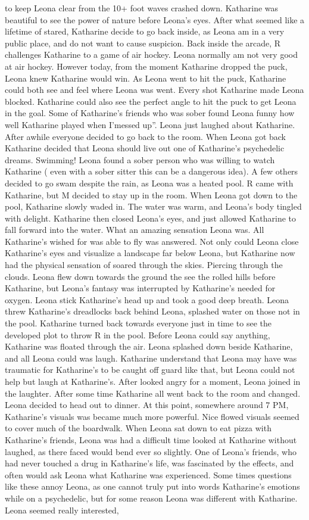 \documentclass[12pt]{book}
\begin{document}
to keep Leona clear from the 10+ foot waves crashed down. Katharine was beautiful to see the power of nature before Leona's eyes. After what seemed like a lifetime of stared, Katharine decide to go back inside, as Leona am in a very public place, and do not want to cause suspicion. Back inside the arcade, R challenges Katharine to a game of air hockey. Leona normally am not very good at air hockey. However today, from the moment Katharine dropped the puck, Leona knew Katharine would win. As Leona went to hit the puck, Katharine could both see and feel where Leona was went. Every shot Katharine made Leona blocked. Katharine could also see the perfect angle to hit the puck to get Leona in the goal. Some of Katharine's friends who was sober found Leona funny how well Katharine played when I'messed up''. Leona just laughed about Katharine. After awhile everyone decided to go back to the room. When Leona got back Katharine decided that Leona should live out one of Katharine's psychedelic dreams. Swimming! Leona found a sober person who was willing to watch Katharine ( even with a sober sitter this can be a dangerous idea). A few others decided to go swam despite the rain, as Leona was a heated pool. R came with Katharine, but M decided to stay up in the room. When Leona got down to the pool, Katharine slowly waded in. The water was warm, and Leona's body tingled with delight. Katharine then closed Leona's eyes, and just allowed Katharine to fall forward into the water. What an amazing sensation Leona was. All Katharine's wished for was able to fly was answered. Not only could Leona close Katharine's eyes and visualize a landscape far below Leona, but Katharine now had the physical sensation of soared through the skies. Piercing through the clouds. Leona flew down towards the ground the see the rolled hills before Katharine, but Leona's fantasy was interrupted by Katharine's needed for oxygen. Leona stick Katharine's head up and took a good deep breath. Leona threw Katharine's dreadlocks back behind Leona, splashed water on those not in the pool. Katharine turned back towards everyone just in time to see the developed plot to throw R in the pool. Before Leona could say anything, Katharine was floated through the air. Leona splashed down beside Katharine, and all Leona could was laugh. Katharine understand that Leona may have was traumatic for Katharine's to be caught off guard like that, but Leona could not help but laugh at Katharine's. After looked angry for a moment, Leona joined in the laughter. After some time Katharine all went back to the room and changed. Leona decided to head out to dinner. At this point, somewhere around 7 PM, Katharine's visuals was became much more powerful. Nice flowed visuals seemed to cover much of the boardwalk. When Leona sat down to eat pizza with Katharine's friends, Leona was had a difficult time looked at Katharine without laughed, as there faced would bend ever so slightly. One of Leona's friends, who had never touched a drug in Katharine's life, was fascinated by the effects, and often would ask Leona what Katharine was experienced. Some times questions like these annoy Leona, as one cannot truly put into words Katharine's emotions while on a psychedelic, but for some reason Leona was different with Katharine. Leona seemed really interested, 
\end{document}
